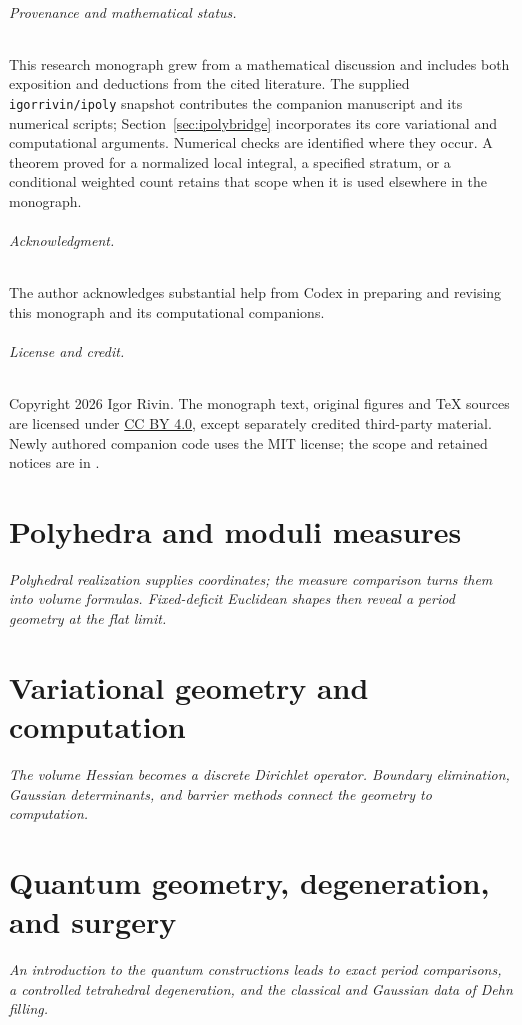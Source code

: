 \documentclass[11pt,a4paper]{article}
\newcommand{\monographpart}[2]{%
  \clearpage\part{#1}%
  \noindent\textit{#2}\par\medskip}
\numberwithin{equation}{section}
\theoremstyle{definition}
\theoremstyle{remark}
\begin{document}
\paragraph{Provenance and mathematical status.}
This research monograph grew from a mathematical discussion and includes
both exposition and deductions from the cited literature. The supplied
\texttt{igorrivin/ipoly} snapshot contributes the companion manuscript
and its numerical scripts; Section~\ref{sec:ipolybridge} incorporates its
core variational and computational arguments. Numerical checks are
identified where they occur. A theorem proved for a normalized local
integral, a specified stratum, or a conditional weighted count retains
that scope when it is used elsewhere in the monograph.

\paragraph{Acknowledgment.}
The author acknowledges substantial help from Codex in preparing and
revising this monograph and its computational companions.

\paragraph{License and credit.}
Copyright 2026 Igor Rivin. The monograph text, original figures and
TeX sources are licensed under
\href{https://creativecommons.org/licenses/by/4.0/}{CC BY 4.0},
except separately credited third-party material. Newly authored
companion code uses the MIT license; the scope and retained notices
are in .


\monographpart{Polyhedra and moduli measures}{Polyhedral realization supplies coordinates; the measure comparison turns them into volume formulas. Fixed-deficit Euclidean shapes then reveal a period geometry at the flat limit.}









\monographpart{Variational geometry and computation}{The volume Hessian becomes a discrete Dirichlet operator. Boundary elimination, Gaussian determinants, and barrier methods connect the geometry to computation.}


\monographpart{Quantum geometry, degeneration, and surgery}{An introduction to the quantum constructions leads to exact period comparisons, a controlled tetrahedral degeneration, and the classical and Gaussian data of Dehn filling.}
\end{document}
